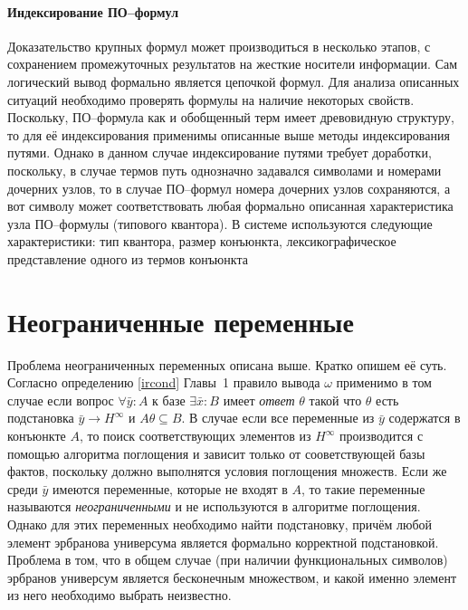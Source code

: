 \paragraph{Индексирование ПО--формул} Доказательство крупных формул может производиться в несколько этапов, с сохранением промежуточных результатов на жесткие носители информации. Сам логический вывод формально является цепочкой формул. Для анализа описанных ситуаций необходимо проверять формулы на наличие некоторых свойств. Поскольку, ПО--формула как и обобщенный терм имеет древовидную структуру, то для её индексирования применимы описанные выше методы индексирования путями. Однако в данном случае индексирование путями требует доработки, поскольку, в случае термов путь однозначно задавался символами и номерами дочерних узлов, то в случае ПО--формул номера дочерних узлов сохраняются, а вот символу может соответствовать любая формально описанная характеристика узла ПО--формулы (типового квантора). В системе используются следующие характеристики: тип квантора, размер конъюнкта, лексикографическое представление одного из термов конъюнкта  %



\section{Неограниченные переменные}
\label{s:uhe}
Проблема неограниченных переменных описана выше. Кратко опишем её суть. Согласно определению \ref{ircond} Главы~1 правило вывода $\omega$ применимо в том случае если вопрос $\forall \bar{y}\colon A$ к базе $\exists \bar{x}\colon B$ имеет {\em ответ} $\theta$  такой что $\theta$ есть подстановка $\bar{y} \rightarrow H^{\infty}$ и $A\theta \subseteq B$. В случае если все переменные из $\bar{y}$ содержатся в конъюнкте $A$, то поиск соответствующих элементов из $H^{\infty}$ производится с помощью алгоритма поглощения и зависит только от сооветствующей базы фактов, поскольку должно выполнятся условия поглощения множеств. Если же среди $\bar{y}$ имеются переменные, которые не входят в $A$, то такие переменные называются \emph{неограниченными} и не используются в алгоритме поглощения. Однако для этих переменных необходимо найти подстановку, причём любой элемент эрбранова универсума является формально корректной подстановкой. Проблема в том, что в общем случае (при наличии функциональных символов) эрбранов универсум является бесконечным множеством, и какой именно элемент из него необходимо выбрать неизвестно.

